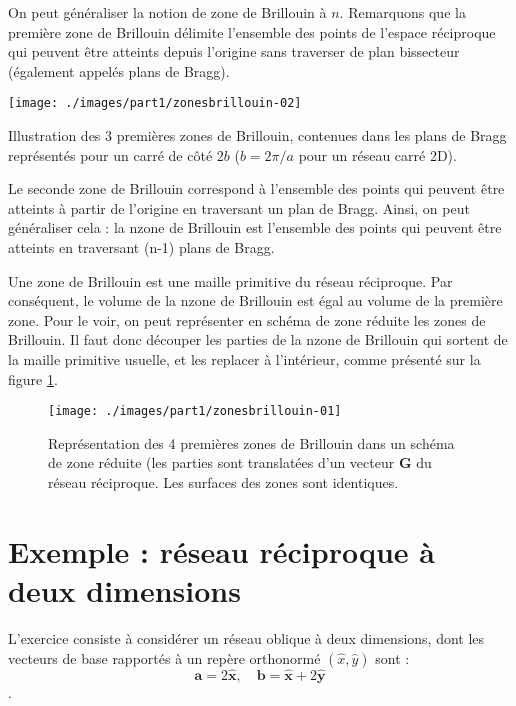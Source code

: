 On peut généraliser la notion de zone de Brillouin à $n$. Remarquons que la première zone de Brillouin délimite l'ensemble des points de l'espace réciproque qui peuvent être atteints depuis l'origine sans traverser de plan bissecteur (également appelés plans de Bragg).

\begin{marginfigure}
    \texttt{[image: ./images/part1/zonesbrillouin-02]}
    \caption{Illustration des 3 premières zones de Brillouin, contenues dans les plans de Bragg représentés pour un carré de côté $2b$ ($b=2\pi/a$ pour un réseau carré 2D).}
    \label{fig:constructionbrillouin}
\end{marginfigure}
Le seconde zone de Brillouin correspond à l'ensemble des points qui peuvent être atteints à partir de l'origine en traversant un plan de Bragg. Ainsi, on peut généraliser cela :
la n\ieme zone de Brillouin est l'ensemble des points qui peuvent être atteints en traversant (n-1) plans de Bragg.

Une zone de Brillouin est une maille primitive du réseau réciproque. Par conséquent, le volume de la n\ieme zone de Brillouin est égal au volume de la première zone. Pour le voir, on peut représenter en schéma de zone réduite les zones de Brillouin. Il faut donc découper les parties de la n\ieme zone de Brillouin qui sortent de la maille primitive usuelle, et les replacer à l'intérieur, comme présenté sur la figure \ref{fig:brillouinreduite}.

\begin{figure}
    \texttt{[image: ./images/part1/zonesbrillouin-01]}
    \caption{Représentation des 4 premières zones de Brillouin dans un schéma de zone réduite (les parties sont translatées d'un vecteur $\mathbf{G}$ du réseau réciproque. Les surfaces des zones sont identiques.}
    \label{fig:brillouinreduite}
\end{figure}

\section{Exemple : réseau réciproque à deux dimensions}

L'exercice consiste à considérer un réseau oblique à deux dimensions, dont les vecteurs de base rapportés à un repère orthonormé $(\hat{x},\hat{y})$ sont :
\begin{equation}
\mathbf{a} = 2\mathbf{\hat{x}},\quad \mathbf{b} = \mathbf{\hat{x}}+2\mathbf{\hat{y}}
\end{equation}.

